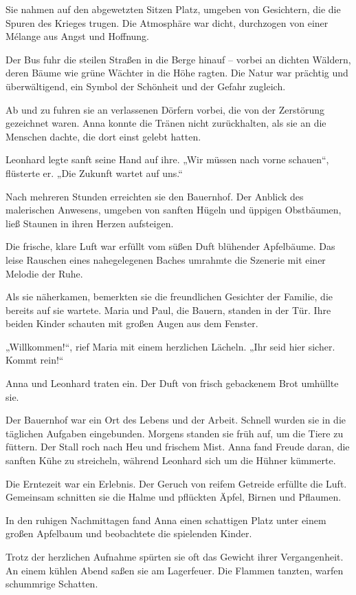 \documentclass[
]{article}
\begin{document}
Sie nahmen auf den abgewetzten Sitzen Platz, umgeben von Gesichtern, die die Spuren des Krieges trugen. Die Atmosphäre war dicht, durchzogen von einer Mélange aus Angst und Hoffnung.

Der Bus fuhr die steilen Straßen in die Berge hinauf -- vorbei an dichten Wäldern, deren Bäume wie grüne Wächter in die Höhe ragten. Die Natur war prächtig und überwältigend, ein Symbol der Schönheit und der Gefahr zugleich.

Ab und zu fuhren sie an verlassenen Dörfern vorbei, die von der Zerstörung gezeichnet waren. Anna konnte die Tränen nicht zurückhalten, als sie an die Menschen dachte, die dort einst gelebt hatten.

Leonhard legte sanft seine Hand auf ihre. „Wir müssen nach vorne schauen``, flüsterte er. „Die Zukunft wartet auf uns.``

Nach mehreren Stunden erreichten sie den Bauernhof. Der Anblick des malerischen Anwesens, umgeben von sanften Hügeln und üppigen Obstbäumen, ließ Staunen in ihren Herzen aufsteigen.

Die frische, klare Luft war erfüllt vom süßen Duft blühender Apfelbäume. Das leise Rauschen eines nahegelegenen Baches umrahmte die Szenerie mit einer Melodie der Ruhe.

Als sie näherkamen, bemerkten sie die freundlichen Gesichter der Familie, die bereits auf sie wartete. Maria und Paul, die Bauern, standen in der Tür. Ihre beiden Kinder schauten mit großen Augen aus dem Fenster.

„Willkommen!{\kern0pt}``, rief Maria mit einem herzlichen Lächeln. „Ihr seid hier sicher. Kommt rein!{\kern0pt}``

Anna und Leonhard traten ein. Der Duft von frisch gebackenem Brot umhüllte sie.

Der Bauernhof war ein Ort des Lebens und der Arbeit. Schnell wurden sie in die täglichen Aufgaben eingebunden. Morgens standen sie früh auf, um die Tiere zu füttern. Der Stall roch nach Heu und frischem Mist. Anna fand Freude daran, die sanften Kühe zu streicheln, während Leonhard sich um die Hühner kümmerte.

Die Erntezeit war ein Erlebnis. Der Geruch von reifem Getreide erfüllte die Luft. Gemeinsam schnitten sie die Halme und pflückten Äpfel, Birnen und Pflaumen.

In den ruhigen Nachmittagen fand Anna einen schattigen Platz unter einem großen Apfelbaum und beobachtete die spielenden Kinder.

Trotz der herzlichen Aufnahme spürten sie oft das Gewicht ihrer Vergangenheit. An einem kühlen Abend saßen sie am Lagerfeuer. Die Flammen tanzten, warfen schummrige Schatten.
\end{document}
